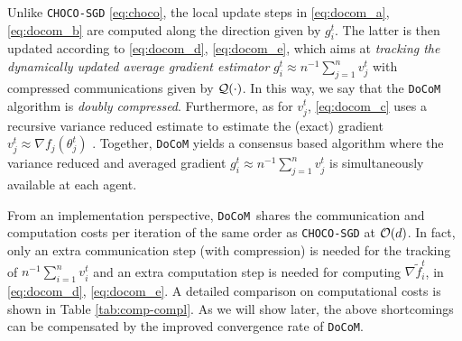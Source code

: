 \documentclass[10pt]{article} %
\newcommand{\revision}{}
\theoremstyle{plain}
\theoremstyle{definition}
\theoremstyle{remark}
\newcommand{\aname}{{\tt DoCoM}}
\newcommand{\prm}{\theta}
\newcommand{\hatprm}{\widehat{\prm}}
\newcommand{\gog}{g}
\newcommand{\hatgog}{\widehat{\gog}}
\newcommand{\stocgrdfp}{\nabla \widetilde{f}}
\newcommand{\re}{\color{red}}
\begin{document}
Unlike {\tt CHOCO-SGD} \eqref{eq:choco}, the local update steps in \eqref{eq:docom_a}, \eqref{eq:docom_b} are computed along the direction given by $g_i^t$. The latter is then updated according to \eqref{eq:docom_d}, \eqref{eq:docom_e}, which aims at \emph{tracking the dynamically updated average gradient estimator} $g_i^t \approx n^{-1}\sum_{j=1}^n v_j^t$ with compressed communications given by ${\cal Q}(\cdot)$. In this way, we say that the {\aname} algorithm is \emph{doubly compressed}. 
Furthermore, as for $v_j^t$, \eqref{eq:docom_c} uses a recursive variance reduced estimate to estimate the (exact) gradient $v_j^t \approx \nabla f_j( \theta_j^t )$ \citep{cutkosky2019momentum, tran2021hybrid}. Together, {\aname} yields a consensus based algorithm where the variance reduced and averaged gradient $g_i^t \approx n^{-1}\sum_{j=1}^n v_j^t$ is simultaneously available at each agent.

From an implementation perspective, \aname~shares the communication and computation costs per iteration {\revision of the same order as {\tt CHOCO-SGD} at ${\cal O}(d)$}. {\revision In fact, only an} extra communication step (with compression) is needed for the tracking of $n^{-1} \sum_{i=1}^n v_i^t$ and an extra computation step is needed for computing $\stocgrdfp_i^t$, in \eqref{eq:docom_d}, \eqref{eq:docom_e}. 
{\revision A detailed comparison on computational costs is shown in Table \ref{tab:comp-compl}.}
As we will show later, the above shortcomings can be compensated by the improved convergence rate of \aname.
\end{document}
